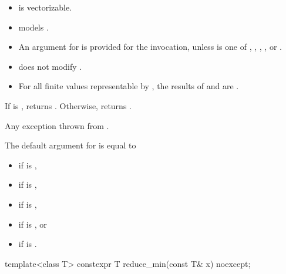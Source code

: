 \begin{itemdescr}
  \pnum\constraints
  \begin{itemize}
    \item {} is vectorizable.

    \item {} models .

    \item An argument for  is provided for the invocation, unless
       is one of , , ,
      , or .
  \end{itemize}

  \pnum\expects
  \begin{itemize}
    \item {} does not modify .

    \item For all finite values  representable by , the results of
       and
       are .
  \end{itemize}

  \pnum\returns
  If  is , returns .
  Otherwise, returns .

  \pnum\throws
  Any exception thrown from .

  \pnum\remarks
  The default argument for  is equal to
  \begin{itemize}
    \item {} if  is ,
    \item {} if  is ,
    \item {} if  is ,
    \item {} if  is , or
    \item {} if  is .
  \end{itemize}
\end{itemdescr}

\begin{itemdecl}
template<class T> constexpr T reduce_min(const T& x) noexcept;
\end{itemdecl}

